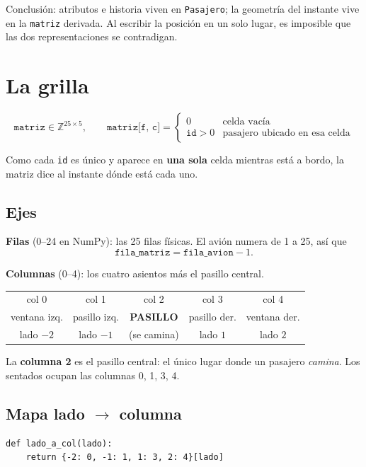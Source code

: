\documentclass[11pt,a4paper]{article}
\begin{document}
Conclusión: atributos e historia viven en \texttt{Pasajero}; la geometría del instante
vive en la \texttt{matriz} derivada. Al escribir la posición en un solo lugar, es
imposible que las dos representaciones se contradigan.

\section{La grilla}

\[
\texttt{matriz} \in \mathbb{Z}^{25 \times 5},
\qquad
\texttt{matriz[f, c]} =
\begin{cases}
0 & \text{celda vacía} \\
\texttt{id} > 0 & \text{pasajero ubicado en esa celda}
\end{cases}
\]

Como cada \texttt{id} es único y aparece en \textbf{una sola} celda mientras está a bordo,
la matriz dice al instante dónde está cada uno.

\subsection*{Ejes}

\textbf{Filas} (0--24 en NumPy): las 25 filas físicas. El avión numera de 1 a 25, así que
\[
\texttt{fila\_matriz} = \texttt{fila\_avion} - 1.
\]

\textbf{Columnas} (0--4): los cuatro asientos más el pasillo central.

\begin{center}
\begin{tabular}{c c c c c}
\toprule
col 0 & col 1 & col 2 & col 3 & col 4 \\
ventana izq. & pasillo izq. & \textbf{PASILLO} & pasillo der. & ventana der. \\
lado $-2$ & lado $-1$ & (se camina) & lado $1$ & lado $2$ \\
\bottomrule
\end{tabular}
\end{center}

La \textbf{columna 2} es el pasillo central: el único lugar donde un pasajero
\emph{camina}. Los sentados ocupan las columnas 0, 1, 3, 4.

\subsection*{Mapa lado $\rightarrow$ columna}

\begin{lstlisting}
def lado_a_col(lado):
    return {-2: 0, -1: 1, 1: 3, 2: 4}[lado]
\end{lstlisting}
\end{document}
